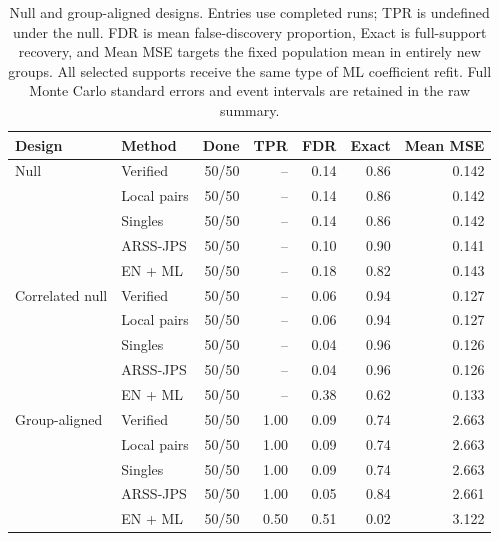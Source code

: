 \begin{table}[H]\centering\small
\setlength{\tabcolsep}{4pt}
\begin{tabular}{llrrrrr}
\toprule
Design & Method & Done & TPR & FDR & Exact & Mean MSE \\
\midrule
Null & Verified & 50/50 & -- & 0.14 & 0.86 & 0.142 \\
 & Local pairs & 50/50 & -- & 0.14 & 0.86 & 0.142 \\
 & Singles & 50/50 & -- & 0.14 & 0.86 & 0.142 \\
 & ARSS-JPS & 50/50 & -- & 0.10 & 0.90 & 0.141 \\
 & EN + ML & 50/50 & -- & 0.18 & 0.82 & 0.143 \\
\midrule
Correlated null & Verified & 50/50 & -- & 0.06 & 0.94 & 0.127 \\
 & Local pairs & 50/50 & -- & 0.06 & 0.94 & 0.127 \\
 & Singles & 50/50 & -- & 0.04 & 0.96 & 0.126 \\
 & ARSS-JPS & 50/50 & -- & 0.04 & 0.96 & 0.126 \\
 & EN + ML & 50/50 & -- & 0.38 & 0.62 & 0.133 \\
\midrule
Group-aligned & Verified & 50/50 & 1.00 & 0.09 & 0.74 & 2.663 \\
 & Local pairs & 50/50 & 1.00 & 0.09 & 0.74 & 2.663 \\
 & Singles & 50/50 & 1.00 & 0.09 & 0.74 & 2.663 \\
 & ARSS-JPS & 50/50 & 1.00 & 0.05 & 0.84 & 2.661 \\
 & EN + ML & 50/50 & 0.50 & 0.51 & 0.02 & 3.122 \\
\bottomrule
\end{tabular}
\caption{Null and group-aligned designs. Entries use completed runs; TPR is undefined under the null. FDR is mean false-discovery proportion, Exact is full-support recovery, and Mean MSE targets the fixed population mean in entirely new groups. All selected supports receive the same type of ML coefficient refit. Full Monte Carlo standard errors and event intervals are retained in the raw summary.}\label{tab:comparison_null}
\end{table}
